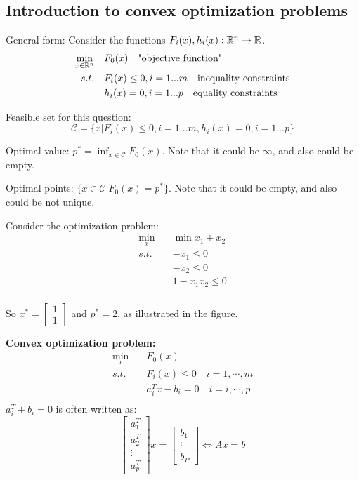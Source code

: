 
\subsection{Introduction to convex optimization problems}
General form: Consider the functions $F_i(x), h_i(x): \mathbb{R}^n\rightarrow \mathbb{R}$.
\begin{align*}
\min_{x\in \mathbb{R}^n} \quad &F_0(x) \quad \text{"objective function"}\\
s.t. \quad &F_i(x) \leq 0, i = 1...m \quad\text{inequality constraints}\\
&h_i(x) =0,i =1...p \quad \text{equality constraints}
\end{align*}


Feasible set for this question:
$$\mathcal{C} = \{x\vert F_i(x) \leq 0,i=1...m,h_i(x) = 0,i = 1...p \}$$


Optimal value: $p^* = \inf_{x\in \mathcal{C}}F_0(x)$. Note that it could be $\infty$, and also could be empty.

Optimal points: $\{x\in \mathcal{C}\vert F_0(x) = p^* \}$. Note that it could be empty, and also could be not unique.



\begin{example}
Consider the optimization problem:
\begin{align*}
\min_x \quad &\min x_1 + x_2 \\
s.t. 
&-x_1\leq 0\\
&-x_2\leq 0\\
&1- x_1 x_2\leq 0\\
\end{align*}

So $x^*=
\begin{bmatrix}
1\\
1
\end{bmatrix}$
and $p^* = 2$, as illustrated in the figure.

\end{example}


\vspace{0.5cm}
\textbf{Convex optimization problem: }
\begin{align*}
\min_x \quad &F_0(x) \\
s.t. &F_i(x)\leq 0 \quad i = 1,\cdots,m\\
&a^T_i x - b_i = 0 \quad i =i,\cdots,p\\
\end{align*}
$a^T_i + b_i = 0$ is often written as:
$$
\begin{bmatrix}
a_1^T\\
a_2^T\\
\vdots\\
a_p^T
\end{bmatrix}x = 
\begin{bmatrix}
b_1\\
\vdots\\
b_P
\end{bmatrix}
\Leftrightarrow
Ax=b
$$

